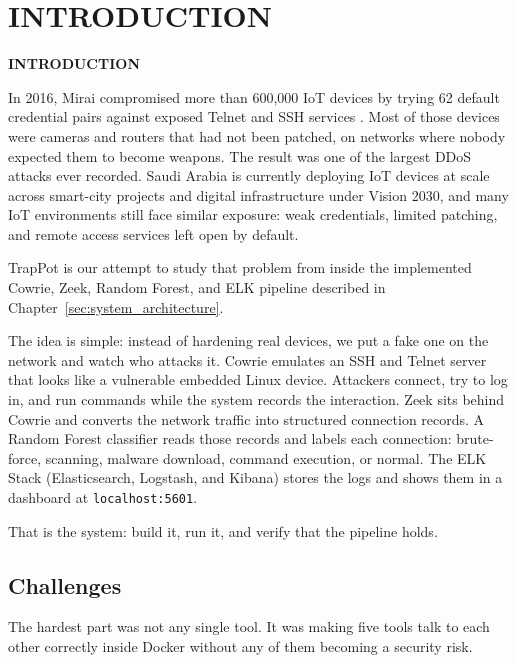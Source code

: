 \chapter{INTRODUCTION}
\pagebreak

\begin{center}
{\LARGE\textbf{INTRODUCTION}}
\end{center}


In 2016, Mirai compromised more than 600,000 IoT devices by trying 62 default credential pairs against exposed Telnet and SSH services \cite{203628}. Most of those devices were cameras and routers that had not been patched, on networks where nobody expected them to become weapons. The result was one of the largest DDoS attacks ever recorded. Saudi Arabia is currently deploying IoT devices at scale across smart-city projects and digital infrastructure under Vision 2030, and many IoT environments still face similar exposure: weak credentials, limited patching, and remote access services left open by default.

TrapPot is our attempt to study that problem from inside the implemented Cowrie, Zeek, Random Forest, and ELK pipeline described in Chapter~\ref{sec:system_architecture}.

The idea is simple: instead of hardening real devices, we put a fake one on the network and watch who attacks it. Cowrie emulates an SSH and Telnet server that looks like a vulnerable embedded Linux device. Attackers connect, try to log in, and run commands while the system records the interaction. Zeek sits behind Cowrie and converts the network traffic into structured connection records. A Random Forest classifier reads those records and labels each connection: brute-force, scanning, malware download, command execution, or normal. The ELK Stack (Elasticsearch, Logstash, and Kibana) stores the logs and shows them in a dashboard at \texttt{localhost:5601}.

That is the system: build it, run it, and verify that the pipeline holds.

\section{Challenges}
\label{sec:challenges}

The hardest part was not any single tool. It was making five tools talk to each other correctly inside Docker without any of them becoming a security risk.

